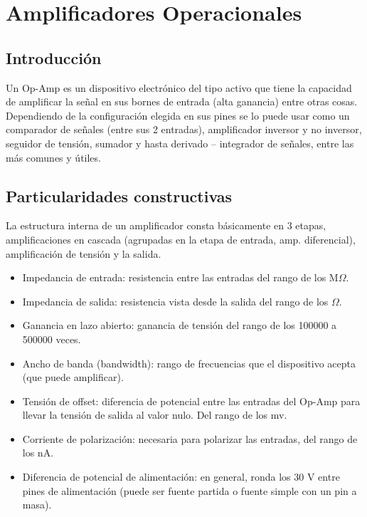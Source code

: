 \documentclass[../main.tex]{subfiles}
\begin{document}
\graphicspath{{../imagenes/opamp/}}
\renewcommand{\subsectionbreak}{}
\section{Amplificadores Operacionales}
	\subsection{Introducción}
	Un Op-Amp es un dispositivo electrónico del tipo activo que tiene la capacidad de
	amplificar la señal en sus bornes de entrada (alta ganancia) entre otras cosas.
	Dependiendo de la configuración elegida en sus pines se lo puede usar como un
	comparador de señales (entre sus 2 entradas), amplificador inversor y no inversor,
	seguidor de tensión, sumador y hasta derivado – integrador de señales, entre las más
	comunes y útiles.


	\subsection{Particularidades constructivas}
	La estructura interna de un amplificador consta básicamente en 3 etapas, amplificaciones
	en cascada (agrupadas en la etapa de entrada, amp. diferencial), amplificación de tensión
	y la salida.

	\begin{itemize}
		\item Impedancia de entrada: resistencia entre las entradas del rango de los M$\Omega$.
		\item Impedancia de salida: resistencia vista desde la salida del rango de los $\Omega$.
		\item Ganancia en lazo abierto: ganancia de tensión del rango de los 100000 a 500000
		veces.
		\item Ancho de banda (bandwidth): rango de frecuencias que el dispositivo acepta (que
		puede amplificar).
		\item Tensión de offset: diferencia de potencial entre las entradas del Op-Amp para
		llevar la tensión de salida al valor nulo. Del rango de los mv.
		\item Corriente de polarización: necesaria para polarizar las entradas, del rango de los
		nA.
		\item Diferencia de potencial de alimentación: en general, ronda los 30 V entre pines
		de alimentación (puede ser fuente partida o fuente simple con un pin a masa).
	\end{itemize}
\end{document}
